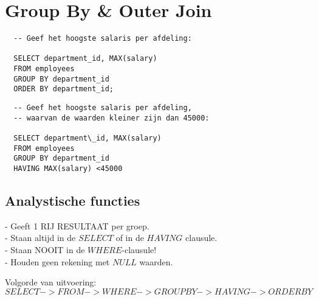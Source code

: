 \section{Group By \& Outer Join}

\begin{tiny}
\begin{lstlisting}
  -- Geef het hoogste salaris per afdeling:

  SELECT department_id, MAX(salary)
  FROM employees
  GROUP BY department_id
  ORDER BY department_id;
\end{lstlisting}

\begin{lstlisting}
  -- Geef het hoogste salaris per afdeling,
  -- waarvan de waarden kleiner zijn dan 45000:

  SELECT department\_id, MAX(salary)
  FROM employees
  GROUP BY department_id
  HAVING MAX(salary) <45000
\end{lstlisting}
\end{tiny}

\subsection{Analystische functies}
- Geeft 1 RIJ RESULTAAT per groep.\\
- Staan altijd in de $SELECT$ of in de $HAVING$ clausule.\\
- Staan NOOIT in de $WHERE$-clausule!\\
- Houden geen rekening met $NULL$ waarden.\\
\newline
{}

Volgorde van uitvoering:\\
$SELECT -> FROM -> WHERE -> GROUP BY -> HAVING -> ORDER BY$